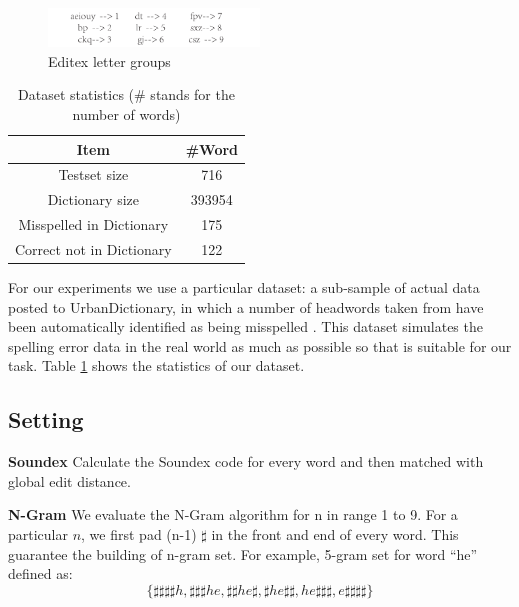 \documentclass[11pt]{article}
\begin{document}
\begin{figure}
	\centering
	\includegraphics[width=0.5\textwidth]{img/editex.pdf}
	\caption{Editex letter groups}
	\label{fig:editex}
\end{figure}

\begin{table}
	\centering
	\begin{tabular}{c|c}
		\hline
		Item & \#Word \\
		\hline
		Testset size & 716 \\
		\hline
		Dictionary  size & 393954 \\
		\hline
		Misspelled in Dictionary & 175 \\
		\hline
		Correct not in Dictionary & 122 \\
		\hline
	\end{tabular}
	\caption{Dataset statistics (\# stands for the number of words)}
	\label{tab:dataset}
\end{table}

For our experiments we use a particular dataset:  a sub-sample of actual data posted to UrbanDictionary, in which a number of headwords taken from have been automatically identified as being misspelled \cite{Saphra2016EvaluatingIW}. This dataset simulates the spelling error data in the real world as much as possible so that is suitable for our task. Table \ref{tab:dataset} shows the statistics of our dataset.

\subsection{Setting} 

\noindent\textbf{Soundex} Calculate the Soundex code for every word and then matched with global edit distance.

\noindent\textbf{N-Gram} We evaluate the N-Gram algorithm for n in range 1 to 9. For a particular $n$, we first pad (n-1) $\sharp$ in the front and end of every word. This guarantee the building of n-gram set. For example, 5-gram set for word ``he'' defined as: 
\begin{equation}
\{\sharp\sharp\sharp\sharp h, \sharp\sharp\sharp he, \sharp\sharp he\sharp, \sharp he\sharp\sharp, he\sharp\sharp\sharp, e\sharp\sharp\sharp\sharp\}
\end{equation}
\end{document}
